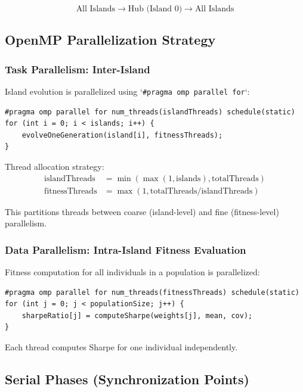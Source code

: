 \documentclass[12pt,a4paper]{article}
\begin{document}
\begin{equation}
\text{All Islands} \rightarrow \text{Hub (Island 0)} \rightarrow \text{All Islands}
\end{equation}

\subsection{OpenMP Parallelization Strategy}

\subsubsection{Task Parallelism: Inter-Island}

Island evolution is parallelized using `\texttt{\#pragma omp parallel for}`:

\begin{verbatim}
#pragma omp parallel for num_threads(islandThreads) schedule(static)
for (int i = 0; i < islands; i++) {
    evolveOneGeneration(island[i], fitnessThreads);
}
\end{verbatim}

Thread allocation strategy:
\begin{equation}
\begin{aligned}
\text{islandThreads} &= \min(\max(1, \text{islands}), \text{totalThreads}) \\
\text{fitnessThreads} &= \max(1, \text{totalThreads} / \text{islandThreads})
\end{aligned}
\end{equation}

This partitions threads between coarse (island-level) and fine (fitness-level) parallelism.

\subsubsection{Data Parallelism: Intra-Island Fitness Evaluation}

Fitness computation for all individuals in a population is parallelized:

\begin{verbatim}
#pragma omp parallel for num_threads(fitnessThreads) schedule(static)
for (int j = 0; j < populationSize; j++) {
    sharpeRatio[j] = computeSharpe(weights[j], mean, cov);
}
\end{verbatim}

Each thread computes Sharpe for one individual independently.

\subsection{Serial Phases (Synchronization Points)}
\end{document}
